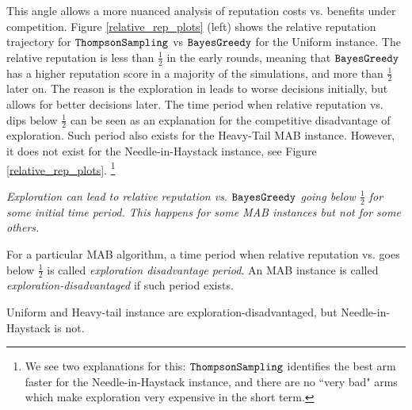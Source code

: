 \documentclass[../competing_bandits.tex]{subfiles}
\begin{document}
This angle allows a more nuanced analysis of reputation costs vs. benefits under competition. Figure \ref{relative_rep_plots} (left) shows the relative reputation trajectory for $\mathtt{ThompsonSampling}$ vs $\mathtt{BayesGreedy}$ for the Uniform instance. The relative reputation is less than $\tfrac12$ in the early rounds, meaning that $\mathtt{BayesGreedy}$ has a higher reputation score in a majority of the simulations, and more than $\tfrac12$ later on. The reason is the exploration in \Thompson leads to worse decisions initially, but allows for better decisions later. The time period when relative reputation vs. \DynamicGreedy dips below $\tfrac12$ can be seen as an explanation for the competitive disadvantage of exploration. Such period also exists for the Heavy-Tail MAB instance. However, it does not exist for the Needle-in-Haystack instance, see Figure \ref{relative_rep_plots}.%
\footnote{We see two explanations for this: $\mathtt{ThompsonSampling}$ identifies the best arm faster for the Needle-in-Haystack instance, and there are no ``very bad" arms which make exploration very expensive in the short term.}


\begin{finding}\label{find:period}
\textit{Exploration can lead to relative reputation vs. $\mathtt{BayesGreedy}$ going below $\tfrac12$ for some initial time period. This happens for some MAB instances but not for some others.}
\end{finding}

\begin{definition}
For a particular MAB algorithm, a time period when relative reputation vs. \DynamicGreedy goes below $\tfrac12$ is called {\em exploration disadvantage period}. An MAB instance is called \emph{exploration-disadvantaged} if such period exists.
\end{definition}

\noindent Uniform and Heavy-tail instance are exploration-disadvantaged, but Needle-in-Haystack is not.
\end{document}
